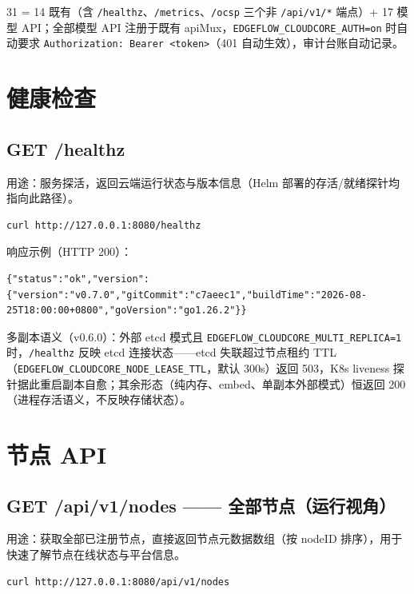 \begin{note}
31 = 14 既有（含 \texttt{/healthz}、\texttt{/metrics}、\texttt{/ocsp} 三个非 \texttt{/api/v1/*} 端点）+ 17 模型 API；全部模型 API 注册于既有 apiMux，\texttt{EDGEFLOW\_CLOUDCORE\_AUTH=on} 时自动要求 \texttt{Authorization: Bearer <token>}（401 自动生效），审计台账自动记录。
\end{note}

\section{健康检查}

\subsection{GET /healthz}

用途：服务探活，返回云端运行状态与版本信息（Helm 部署的存活/就绪探针均指向此路径）。

\begin{lstlisting}
curl http://127.0.0.1:8080/healthz
\end{lstlisting}

响应示例（HTTP 200）：

\begin{lstlisting}
{"status":"ok","version":{"version":"v0.7.0","gitCommit":"c7aeec1","buildTime":"2026-08-25T18:00:00+0800","goVersion":"go1.26.2"}}
\end{lstlisting}

多副本语义（v0.6.0）：外部 etcd 模式且 \texttt{EDGEFLOW\_CLOUDCORE\_MULTI\_REPLICA=1} 时，\texttt{/healthz} 反映 etcd 连接状态——etcd 失联超过节点租约 TTL（\texttt{EDGEFLOW\_CLOUDCORE\_NODE\_LEASE\_TTL}，默认 300s）返回 503，K8s liveness 探针据此重启副本自愈；其余形态（纯内存、embed、单副本外部模式）恒返回 200（进程存活语义，不反映存储状态）。

\section{节点 API}

\subsection{GET /api/v1/nodes —— 全部节点（运行视角）}

用途：获取全部已注册节点，直接返回节点元数据数组（按 nodeID 排序），用于快速了解节点在线状态与平台信息。

\begin{lstlisting}
curl http://127.0.0.1:8080/api/v1/nodes
\end{lstlisting}

